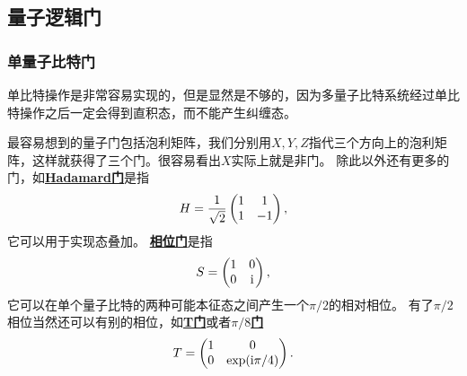 \documentclass[hyperref, UTF8, a4paper]{ctexart}
\newcommand*{\ii}{\mathrm{i}}
\newcommand*{\concept}[1]{\underline{\textbf{#1}}}
\begin{document}
\subsection{量子逻辑门}

\subsubsection{单量子比特门}

单比特操作是非常容易实现的，但是显然是不够的，因为多量子比特系统经过单比特操作之后一定会得到直积态，而不能产生纠缠态。

最容易想到的量子门包括泡利矩阵，我们分别用$X, Y, Z$指代三个方向上的泡利矩阵，这样就获得了三个门。很容易看出$X$实际上就是非门。
除此以外还有更多的门，如\concept{Hadamard门}是指
\begin{equation}
    H = \frac{1}{\sqrt{2}} \pmqty{1 & 1 \\ 1 & -1},
\end{equation}
它可以用于实现态叠加。
\concept{相位门}是指
\begin{equation}
    S = \pmqty{1 & 0 \\ 0 & \ii},
\end{equation}
它可以在单个量子比特的两种可能本征态之间产生一个$\pi/2$的相对相位。
有了$\pi/2$相位当然还可以有别的相位，如\concept{T门}或者\concept{$\pi/8$门}
\begin{equation}
    T = \pmqty{1 & 0 \\ 0 & \exp(\ii \pi / 4)}.
\end{equation}
\end{document}

